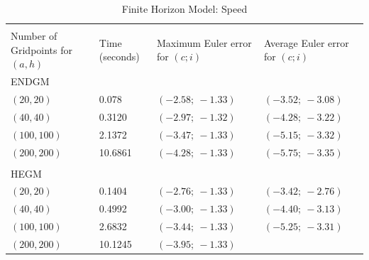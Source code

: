 \documentclass[a4paper,12pt]{article}%
\begin{document}
\begin{table}[htb] \centering
\caption{Finite Horizon Model: Speed}%
\begin{tabular}
[c]{p{4cm}p{2cm}p{4cm}p{4cm}}%
\multicolumn{1}{l}{} &  & \multicolumn{1}{l}{} & \multicolumn{1}{l}{}\\
Number of Gridpoints for $(a,h)$ & \multicolumn{1}{||p{2cm}}{Time (seconds)} &
\multicolumn{1}{|p{4cm}}{Maximum Euler error for $\left(  c;i\right)  $} &
\multicolumn{1}{|p{4cm}}{Average Euler error for $\left(  c;i\right)  $%
}\\\hline
ENDGM & \multicolumn{1}{||p{2cm}}{} & \multicolumn{1}{|p{4cm}}{} &
\multicolumn{1}{|p{4cm}}{}\\
$\left(  20,20\right)  $ & \multicolumn{1}{||p{2cm}}{0.078} &
\multicolumn{1}{|p{4cm}}{$(-2.58;\ -1.33)$} &
\multicolumn{1}{|p{4cm}}{$(-3.52;\ -3.08)$}\\
$\left(  40,40\right)  $ & \multicolumn{1}{||p{2cm}}{0.3120} &
\multicolumn{1}{|p{4cm}}{$(-2.97;\ -1.32)$} &
\multicolumn{1}{|p{4cm}}{$(-4.28;\ -3.22)$}\\
$\left(  100,100\right)  $ & \multicolumn{1}{||p{2cm}}{2.1372} &
\multicolumn{1}{|p{4cm}}{$(-3.47;\ -1.33)$} &
\multicolumn{1}{|p{4cm}}{$(-5.15;\ -3.32)$}\\
$\left(  200,200\right)  $ & \multicolumn{1}{||p{2cm}}{10.6861} &
\multicolumn{1}{|p{4cm}}{$(-4.28;\ -1.33)$} &
\multicolumn{1}{|p{4cm}}{$(-5.75;\ -3.35)$}\\
& \multicolumn{1}{||p{2cm}}{} & \multicolumn{1}{|p{4cm}}{} &
\multicolumn{1}{|p{4cm}}{}\\\hline
HEGM & \multicolumn{1}{||p{2cm}}{} & \multicolumn{1}{|p{4cm}}{} &
\multicolumn{1}{|p{4cm}}{}\\
$\left(  20,20\right)  $ & \multicolumn{1}{||p{2cm}}{0.1404} &
\multicolumn{1}{|p{4cm}}{$(-2.76;\ -1.33)$} &
\multicolumn{1}{|p{4cm}}{$(-3.42;\ -2.76)$}\\
$\left(  40,40\right)  $ & \multicolumn{1}{||p{2cm}}{0.4992} &
\multicolumn{1}{|p{4cm}}{$(-3.00;\ -1.33)$} &
\multicolumn{1}{|p{4cm}}{$(-4.40;\ -3.13)$}\\
$\left(  100,100\right)  $ & \multicolumn{1}{||p{2cm}}{2.6832} &
\multicolumn{1}{|p{4cm}}{$(-3.44;\ -1.33)$} &
\multicolumn{1}{|p{4cm}}{$(-5.25;\ -3.31)$}\\
$\left(  200,200\right)  $ & \multicolumn{1}{||p{2cm}}{10.1245} &
\multicolumn{1}{|p{4cm}}{$(-3.95;\ -1.33)$} &

\end{tabular}
\end{table}
\end{document}
